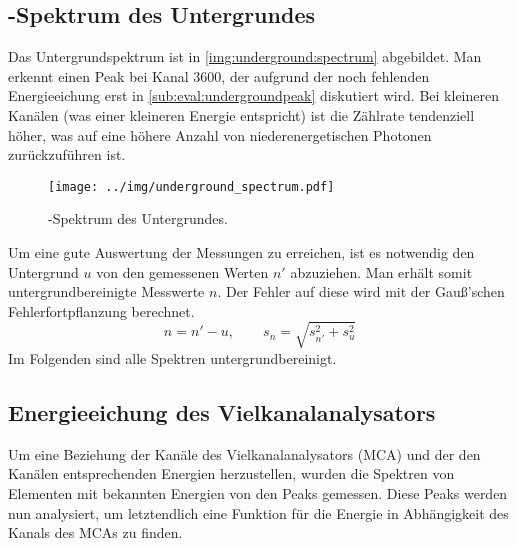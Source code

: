 \subsection{\textgamma-Spektrum des Untergrundes}
Das Untergrundspektrum ist in \autoref{img:underground:spectrum} abgebildet. Man erkennt einen Peak bei Kanal 3600, der aufgrund der noch 
fehlenden Energieeichung erst in \ref{sub:eval:undergroundpeak} diskutiert wird. Bei kleineren Kanälen (was einer kleineren Energie entspricht) ist 
die Zählrate tendenziell höher, was auf eine höhere Anzahl von niederenergetischen Photonen zurückzuführen ist. 
\begin{figure}[H]
\begin{center}
  \texttt{[image: ../img/underground\_spectrum.pdf]}
  \caption{\textgamma-Spektrum des Untergrundes.}
  \label{img:underground:spectrum}
\end{center}
\end{figure}
Um eine gute Auswertung der Messungen zu erreichen, ist es notwendig den Untergrund $u$ von den gemessenen Werten $n'$ abzuziehen. Man erhält 
somit untergrundbereinigte Messwerte $n$. Der Fehler auf diese wird mit der Gauß'schen Fehlerfortpflanzung berechnet.
\begin{equation}
  n = n' - u, \qquad s_n = \sqrt{s_{n'}^2 + s_u^2}
\end{equation}
Im Folgenden sind alle Spektren untergrundbereinigt.

\subsection{Energieeichung des Vielkanalanalysators}
Um eine Beziehung der Kanäle des Vielkanalanalysators (MCA) und der den Kanälen entsprechenden Energien herzustellen, wurden die Spektren von Elementen 
mit bekannten Energien von den Peaks gemessen. Diese Peaks werden nun analysiert, um letztendlich eine Funktion für die Energie in Abhängigkeit des 
Kanals des MCAs zu finden.
